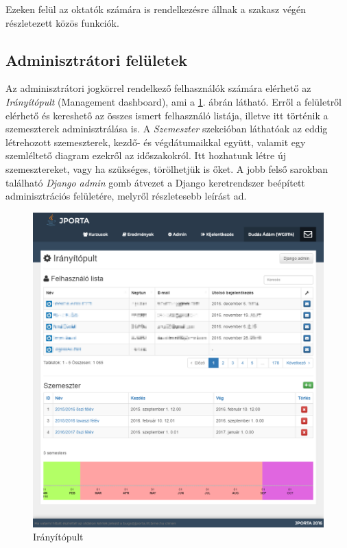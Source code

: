 Ezeken felül az oktatók számára is rendelkezésre állnak a szakasz végén részletezett közös funkciók.

\subsection{Adminisztrátori felületek}
Az adminisztrátori jogkörrel rendelkező felhasználók számára elérhető az \textit{Irányítópult} (Management dashboard), ami a \ref{figure:jporta-management-dashboard}. ábrán látható.
Erről a felületről elérhető és kereshető az összes ismert felhasználó listája, illetve itt történik a szemeszterek adminisztrálása is.
A \textit{Szemeszter} szekcióban láthatóak az eddig létrehozott szemeszterek, kezdő- és végdátumaikkal együtt, valamit egy szemléltető diagram ezekről az időszakokról.
Itt hozhatunk létre új szemesztereket, vagy ha szükséges, törölhetjük is őket. 
A jobb felső sarokban található \textit{Django admin} gomb átvezet a Django keretrendszer beépített adminisztrációs felületére, melyről részletesebb leírást \cite{DjangoAdmin} ad.
\begin{figure}[h]
    \centering
    \includegraphics[width=\textwidth]{figures/Jporta-management-dashboard}
    \caption{Irányítópult}
    \label{figure:jporta-management-dashboard}
\end{figure}

